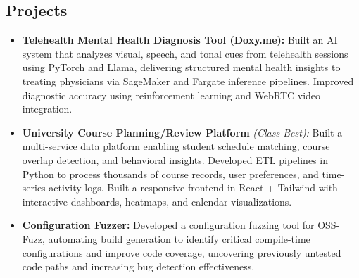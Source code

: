 \documentclass[11pt,letterpaper]{article}
\begin{document}
\vspace{-1em}
\subsection*{\Large Projects}
\begin{itemize}[leftmargin=1em,noitemsep]
\item \textbf{Telehealth Mental Health Diagnosis Tool (Doxy.me):} Built an AI system that analyzes visual, speech, and tonal cues from telehealth sessions using PyTorch and Llama, delivering structured mental health insights to treating physicians via SageMaker and Fargate inference pipelines. Improved diagnostic accuracy using reinforcement learning and WebRTC video integration.
\item \textbf{University Course Planning/Review Platform} \emph{(Class Best):} Built a multi-service data platform enabling student schedule matching, course overlap detection, and behavioral insights. Developed ETL pipelines in Python to process thousands of course records, user preferences, and time-series activity logs. Built a responsive frontend in React + Tailwind with interactive dashboards, heatmaps, and calendar visualizations.
\item \textbf{Configuration Fuzzer:} Developed a configuration fuzzing tool for OSS-Fuzz, automating build generation to identify critical compile-time configurations and improve code coverage, uncovering previously untested code paths and increasing bug detection effectiveness.
\end{itemize}
\end{document}
